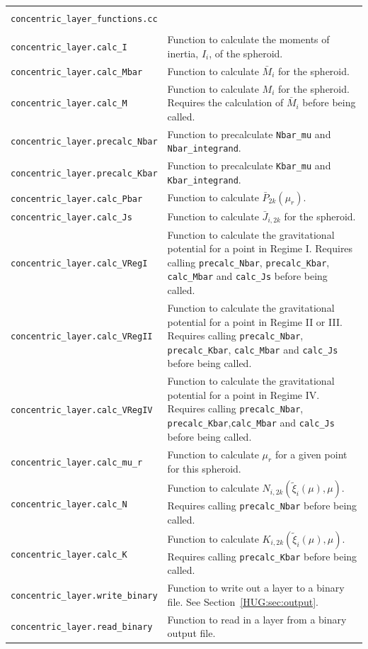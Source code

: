 \documentclass[11pt, oneside]{article}   	%
\begin{document}
\begin{longtable}{l p{10cm}}
\multicolumn{2}{l}{} \\
\multicolumn{2}{l}{\texttt{concentric\_layer\_functions.cc}} \\
\hline \\
\texttt{concentric\_layer.calc\_I} & Function to calculate the moments of inertia, $I_i$, of the spheroid. \\
\texttt{concentric\_layer.calc\_Mbar} & Function to calculate $\bar{M}_i$ for the spheroid. \\
\texttt{concentric\_layer.calc\_M} & Function to calculate $M_i$ for the spheroid. Requires the calculation of $\bar{M}_i$ before being called. \\
\texttt{concentric\_layer.precalc\_Nbar} & Function to precalculate \texttt{Nbar\_mu}  and \texttt{Nbar\_integrand}. \\
\texttt{concentric\_layer.precalc\_Kbar} & Function to precalculate \texttt{Kbar\_mu}  and \texttt{Kbar\_integrand}. \\
\texttt{concentric\_layer.calc\_Pbar} & Function to calculate $\bar{P}_{2k}(\mu_r)$. \\
\texttt{concentric\_layer.calc\_Js} & Function to calculate $\bar{J}_{i,2k}$ for the spheroid. \\
\texttt{concentric\_layer.calc\_VRegI} & Function to calculate the gravitational potential for a point in Regime I. Requires calling \texttt{precalc\_Nbar}, \texttt{precalc\_Kbar}, \texttt{calc\_Mbar} and \texttt{calc\_Js} before being called.  \\
\texttt{concentric\_layer.calc\_VRegII} & Function to calculate the gravitational potential for a point in Regime II or III. Requires calling \texttt{precalc\_Nbar}, \texttt{precalc\_Kbar}, \texttt{calc\_Mbar} and \texttt{calc\_Js} before being called.  \\
\texttt{concentric\_layer.calc\_VRegIV} & Function to calculate the gravitational potential for a point in Regime IV. Requires calling \texttt{precalc\_Nbar}, \texttt{precalc\_Kbar},\texttt{calc\_Mbar} and \texttt{calc\_Js} before being called. \\
\texttt{concentric\_layer.calc\_mu\_r} & Function to calculate $\mu_r$ for a given point for this spheroid. \\
\texttt{concentric\_layer.calc\_N} & Function to calculate $N_{i,2k} (\tilde{\xi}_i (\mu), \mu)$. Requires calling \texttt{precalc\_Nbar} before being called. \\
\texttt{concentric\_layer.calc\_K} & Function to calculate $K_{i,2k} (\tilde{\xi}_i (\mu), \mu)$. Requires calling \texttt{precalc\_Kbar} before being called. \\
\texttt{concentric\_layer.write\_binary} & Function to write out a layer to a binary file. See Section~\ref{HUG:sec:output}. \\
\texttt{concentric\_layer.read\_binary} & Function to read in a layer from a binary output file. \\


\end{longtable}
\end{document}

